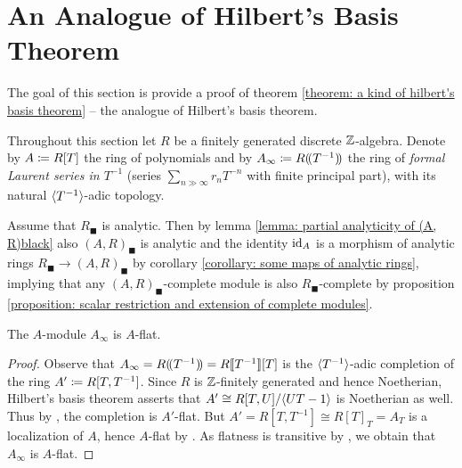 \newpage
\section{An Analogue of Hilbert's Basis Theorem}
\label{section: an analogue of hilbert's basis theorem}

The goal of this section is provide a proof of theorem \ref{theorem: a kind of hilbert's basis theorem} -- the analogue of Hilbert's basis theorem.

\begin{convention}
	Throughout this section let $R$ be a finitely generated discrete ${\mathbb{Z}}$-algebra. Denote by $A\coloneqq R[T]$ the ring of polynomials and by $A_\infty\coloneqq {R(\!(T^{-1})\!)}$ the ring of \emph{formal Laurent series in $T^{-1}$} (\ie series $\sum_{n\gg \infty} r_n T^{-n}$ with finite principal part), with its natural ${\langle T^{-1}\rangle}$-adic topology.
	
	Assume that $R_\blacksquare$ is analytic. Then by lemma \ref{lemma: partial analyticity of (A, R)black} also $(A, R)_\blacksquare$ is analytic and the identity $\mathrm{id}_A$ is a morphism of analytic rings $R_\blacksquare \to (A, R)_\blacksquare$ by corollary \ref{corollary: some maps of analytic rings}, implying that any $(A, R)_\blacksquare$-complete module is also $R_\blacksquare$-complete by proposition \ref{proposition: scalar restriction and extension of complete modules}.
\end{convention}

\begin{lemma}
	\label{lemma: Ainfty is A-flat, f.g. case}
	
	The $A$-module $A_\infty$ is $A$-flat.
\end{lemma}
\begin{proof}
	Observe that $A_\infty = {R(\!(T^{-1})\!)} = {R[\![T^{-1}]\!]}[T]$ is the ${\langle T^{-1}\rangle}$-adic completion of the ring $A'\coloneqq R[T, T^{-1}]$. Since $R$ is ${\mathbb{Z}}$-finitely generated and hence Noetherian, Hilbert's basis theorem asserts that $A'\cong R[T, U]/{\langle UT - 1\rangle}$ is Noetherian as well. Thus by \cite[\href{https://stacks.math.columbia.edu/tag/00HT}{Tag 00HT}]{stacks-project}, the completion is $A'$-flat. But $A' = R[T, T^{-1}]\cong R[T]_T = A_T$ is a localization of $A$, hence $A$-flat by \cite[\href{https://stacks.math.columbia.edu/tag/00HT}{Tag 00HT}]{stacks-project}. As flatness is transitive by \cite[\href{https://stacks.math.columbia.edu/tag/00HT}{Tag 00HT}]{stacks-project}, we obtain that $A_\infty$ is $A$-flat.
\end{proof}

